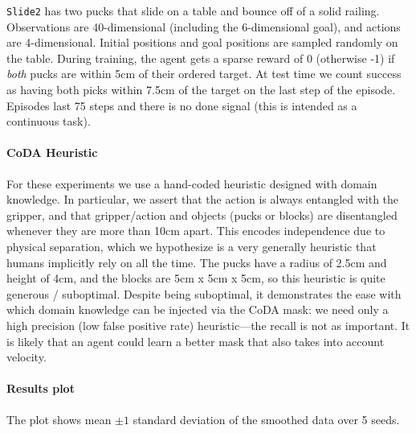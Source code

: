 \documentclass[coda.tex]{subfiles}
\begin{document}
\texttt{Slide2} has two pucks that slide on a table and bounce off of a solid railing. Observations are 40-dimensional (including the 6-dimensional goal), and actions are 4-dimensional. Initial positions and goal positions are sampled randomly on the table. During training, the agent gets a sparse reward of 0 (otherwise -1) if \textit{both} pucks are within 5cm of their ordered target. At test time we count success as having both picks within 7.5cm of the target on the last step of the episode. Episodes last 75 steps and there is no done signal (this is intended as a continuous task).

\paragraph{CoDA Heuristic} For these experiments we use a hand-coded heuristic designed with domain knowledge. In particular, we assert that the action is always entangled with the gripper, and that gripper/action and objects (pucks or blocks) are disentangled whenever they are more than 10cm apart. This encodes independence due to physical separation, which we hypothesize is a very generally heuristic that humans implicitly rely on all the time.  The pucks have a radius of 2.5cm and height of 4cm, and the blocks are 5cm x 5cm x 5cm, so this heuristic is quite generous / suboptimal. Despite being suboptimal, it demonstrates the ease with which domain knowledge can be injected via the CoDA mask: we need only a high precision (low false positive rate) heuristic---the recall is not as important. It is likely that an agent could learn a better mask that also takes into account velocity.

\paragraph{Results plot} The plot shows mean $\pm 1$ standard deviation of the smoothed data over 5 seeds.
\end{document}
